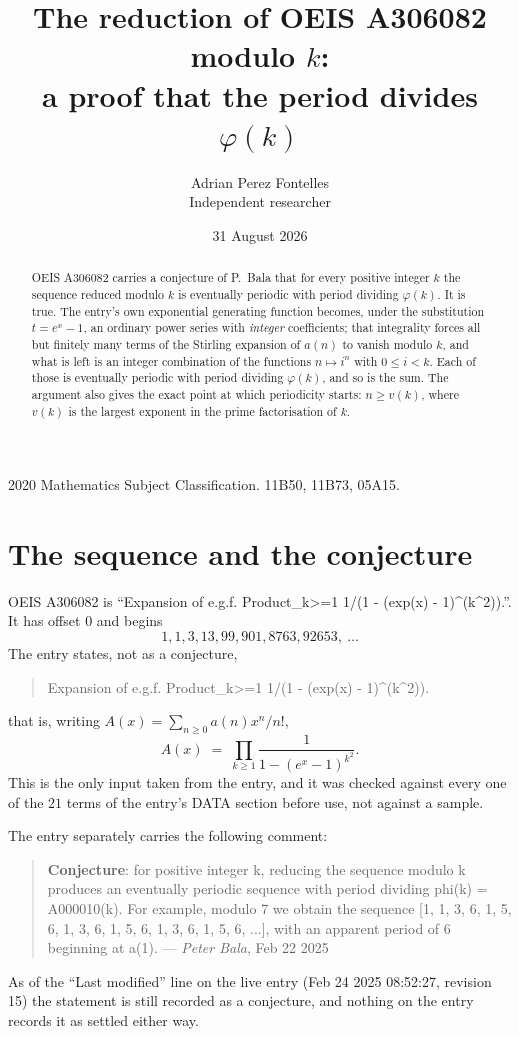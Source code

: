 \documentclass[11pt,a4paper]{article}
\title{The reduction of OEIS A306082 modulo $k$:\\ a proof that the period divides
$\varphi(k)$}
\author{Adrian Perez Fontelles\\ \small Independent researcher}
\date{31 August 2026}
\theoremstyle{plain}
\theoremstyle{definition}
\begin{document}
\maketitle

\begin{abstract}
OEIS A306082 carries a conjecture of P.~Bala that for every positive integer $k$ the
sequence reduced modulo $k$ is eventually periodic with period dividing $\varphi(k)$.
It is true. The entry's own exponential generating function becomes, under the
substitution $t=e^{x}-1$, an ordinary power series with \emph{integer} coefficients;
that integrality forces all but finitely many terms of the Stirling expansion of $a(n)$
to vanish modulo $k$, and what is left is an integer combination of the functions
$n\mapsto i^{n}$ with $0\le i<k$. Each of those is eventually periodic with period
dividing $\varphi(k)$, and so is the sum. The argument also gives the exact point at
which periodicity starts: $n\ge v(k)$, where $v(k)$ is the largest exponent in the
prime factorisation of $k$.
\end{abstract}

\noindent\small 2020 Mathematics Subject Classification. 11B50, 11B73, 05A15.\normalsize

\section{The sequence and the conjecture}

OEIS A306082 is ``Expansion of e.g.f. Product\_{k>=1} 1/(1 - (exp(x) - 1)\^{}(k\^{}2)).''. It has offset $0$ and begins
\[
1, 1, 3, 13, 99, 901, 8763, 92653,\ \dots
\]
The entry states, not as a conjecture,
\begin{quote}\small
Expansion of e.g.f. Product\_{k>=1} 1/(1 - (exp(x) - 1)\^{}(k\^{}2)).
\end{quote}
that is, writing $A(x)=\sum_{n\ge 0}a(n)x^{n}/n!$,
\begin{equation}\label{eq:egf}
A(x)\;=\;\prod_{k\ge 1}\frac{1}{1-(e^{x}-1)^{k^{2}}}.
\end{equation}
This is the only input taken from the entry, and it was checked against every one of the
$21$ terms of the entry's DATA section before use, not against a sample.

The entry separately carries the following comment:
\begin{quote}\small
\textbf{Conjecture}: for positive integer k, reducing the sequence modulo k produces an eventually periodic sequence with period dividing phi(k) = A000010(k). For example, modulo 7 we obtain the sequence [1, 1, 3, 6, 1, 5, 6, 1, 3, 6, 1, 5, 6, 1, 3, 6, 1, 5, 6, ...], with an apparent period of 6 beginning at a(1). --- \emph{Peter Bala}, Feb 22 2025
\end{quote}
As of the ``Last modified'' line on the live entry (Feb 24 2025 08:52:27, revision
15) the statement is still recorded as a conjecture, and nothing on the entry
records it as settled either way.
\end{document}
